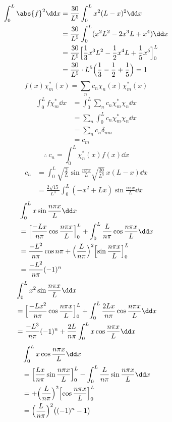 \begin{align*}
\int_{0}^{L}\abs{f}^{2}\dd x&=\frac{30}{L^{5}}\int_{0}^{L}x^{2}(L-x)^{2}\dd x\\
&=\frac{30}{L^{5}}\int_{0}^{L}(x^{2}L^{2}-2x^{3}L+x^{4})\dd x\\
&=\frac{30}{L^{5}}\Bigl[\frac{1}{3}x^{3}L^{2}-\frac{1}{2}x^{4}L+\frac{1}{5}x^{5}\Bigr]_{0}^{L}\\
&=\frac{30}{L^{5}}\cdot L^{5}\Bigl(\frac{1}{3}-\frac{1}{2}+\frac{1}{5}\Bigr)=1
\end{align*}
\[ f(x)\chi_{m}^{*}(x)=\sum_{n}c_{n}\chi_{n}(x)\chi_{m}^{*}(x) \]
\begin{align*}
\int_{0}^{L}f\chi_{m}^{*}\dd x&=\int_{0}^{L}\sum_{n}c_{n}\chi_{m}^{*}\chi_{n}\dd x\\
&=\sum_{n}\int_{0}^{L}c_{n}\chi_{m}^{*}\chi_{n}\dd x\\
&=\sum_{n}c_{n}\delta_{nm}\\
&=c_{m}
\end{align*}
\[ \therefore\ c_{n}=\int_{0}^{L}\chi_{n}^{*}(x)f(x)\dd x \]
\begin{align*}
c_{n}&=\int_{0}^{L}\sqrt{\frac{2}{L}}\sin\frac{n\pi x}{L}\sqrt{\frac{30}{L^{5}}}\,x(L-x)\dd x\\
&=\frac{2\sqrt{15}}{L^{3}}\int_{0}^{L}(-x^{2}+Lx)\sin\frac{n\pi x}{L}\dd x
\end{align*}
\begin{align*}
&\int_{0}^{L}x\sin\frac{n\pi x}{L}\dd x\\
&=\Bigl[\frac{-Lx}{n\pi}\cos\frac{n\pi x}{L}\Bigr]_{0}^{L}+\int_{0}^{L}\frac{L}{n\pi}\cos\frac{n\pi x}{L}\dd x\\
&=\frac{-L^{2}}{n\pi}\cos n\pi+\Bigl(\frac{L}{n\pi}\Bigr)^{2}\Bigl[\sin\frac{n\pi x}{L}\Bigr]_{0}^{L}\\
&=\frac{-L^{2}}{n\pi}(-1)^{n}
\end{align*}
\begin{align*}
&\int_{0}^{L}x^{2}\sin\frac{n\pi x}{L}\dd x\\
&=\Bigl[\frac{-Lx^{2}}{n\pi}\cos\frac{n\pi x}{L}\Bigr]_{0}^{L}+\int_{0}^{L}\frac{2Lx}{n\pi}\cos\frac{n\pi x}{L}\dd x\\
&=\frac{-L^{3}}{n\pi}(-1)^{n}+\frac{2L}{n\pi}\int_{0}^{L}x\cos\frac{n\pi x}{L}\dd x
\end{align*}
\begin{align*}
&\int_{0}^{L}x\cos\frac{n\pi x}{L}\dd x\\
&=\Bigl[\frac{Lx}{n\pi}\sin\frac{n\pi x}{L}\Bigr]_{0}^{L}-\int_{0}^{L}\frac{L}{n\pi}\sin\frac{n\pi x}{L}\dd x\\
&=+\Bigl(\frac{L}{n\pi}\Bigr)^{2}\Bigl[\cos\frac{n\pi x}{L}\Bigr]_{0}^{L}\\
&=\Bigl(\frac{L}{n\pi}\Bigr)^{2}\bigl((-1)^{n}-1\bigr)
\end{align*}
